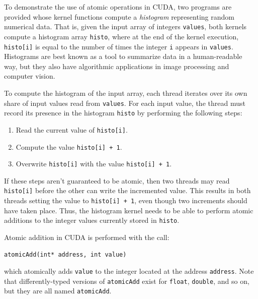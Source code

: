 \documentclass{article}
\theoremstyle{definition}
\begin{document}
To demonstrate the use of atomic operations in CUDA, two programs are provided whose kernel functions compute a \emph{histogram} representing random numerical data. That is, given the input array of integers \texttt{values}, both kernels compute a histogram array \texttt{histo}, where at the end of the kernel execution, \texttt{histo[i]} is equal to the number of times the integer \texttt{i} appears in \texttt{values}. Histograms are best known as a tool to summarize data in a human-readable way, but they also have algorithmic applications in image processing and computer vision.

To compute the histogram of the input array, each thread iterates over its own share of input values read from \texttt{values}. For each input value, the thread must record its presence in the histogram \texttt{histo} by performing the following steps:
\begin{enumerate}
    \item Read the current value of \texttt{histo[i]}.
    \item Compute the value \texttt{histo[i] + 1}.
    \item Overwrite \texttt{histo[i]} with the value \texttt{histo[i] + 1}.
\end{enumerate}
If these steps aren't guaranteed to be atomic, then two  threads may read \texttt{histo[i]} before the other can write the incremented value. This results in both threads setting the value to \texttt{histo[i] + 1}, even though two increments should have taken place. Thus, the histogram kernel needs to be able to perform atomic additions to the integer values currently stored in \texttt{histo}.

Atomic addition in CUDA is performed with the call: \begin{verbatim}atomicAdd(int* address, int value)\end{verbatim}
which atomically adds \texttt{value} to the integer located at the address \texttt{address}. Note that differently-typed versions of \texttt{atomicAdd} exist for \texttt{float}, \texttt{double}, and so on, but they are all named \texttt{atomicAdd}.
\end{document}
